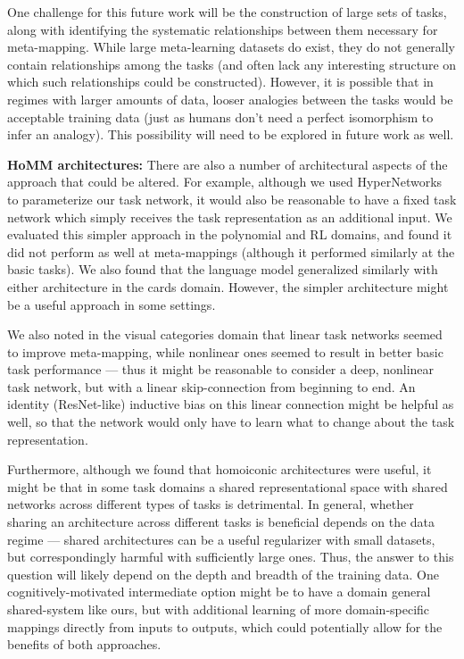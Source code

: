 One challenge for this future work will be the construction of large sets of tasks, along with identifying the systematic relationships between them necessary for meta-mapping. While large meta-learning datasets do exist, they do not generally contain relationships among the tasks (and often lack any interesting structure on which such relationships could be constructed). However, it is possible that in regimes with larger amounts of data, looser analogies between the tasks would be acceptable training data (just as humans don't need a perfect isomorphism to infer an analogy). This possibility will need to be explored in future work as well. \par

\textbf{HoMM architectures:} There are also a number of architectural aspects of the approach that could be altered. For example, although we used HyperNetworks to parameterize our task network, it would also be reasonable to have a fixed task network which simply receives the task representation as an additional input. We evaluated this simpler approach in the polynomial and RL domains, and found it did not perform as well at meta-mappings (although it performed similarly at the basic tasks). We also found that the language model generalized similarly with either architecture in the cards domain. However, the simpler architecture might be a useful approach in some settings.\par 

We also noted in the visual categories domain that linear task networks seemed to improve meta-mapping, while nonlinear ones seemed to result in better basic task performance --- thus it might be reasonable to consider a deep, nonlinear task network, but with a linear skip-connection from beginning to end. An identity (ResNet-like) inductive bias on this linear connection might be helpful as well, so that the network would only have to learn what to change about the task representation. \par 

Furthermore, although we found that homoiconic architectures were useful, it might be that in some task domains a shared representational space with shared networks across different types of tasks is detrimental. In general, whether sharing an architecture across different tasks is beneficial depends on the data regime --- shared architectures can be a useful regularizer with small datasets, but correspondingly harmful with sufficiently large ones. Thus, the answer to this question will likely depend on the depth and breadth of the training data. One cognitively-motivated intermediate option might be to have a domain general shared-system like ours, but with additional learning of more domain-specific mappings directly from inputs to outputs, which could potentially allow for the benefits of both approaches.\par

